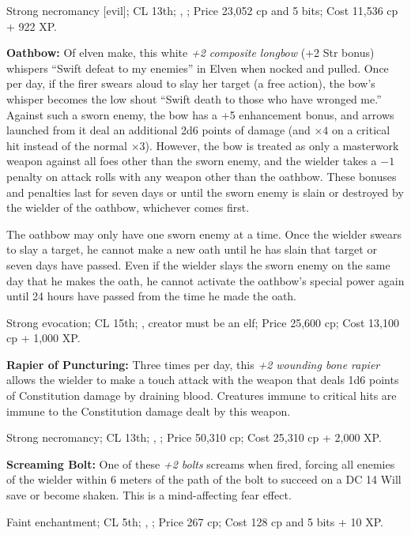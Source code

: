Strong necromancy [evil]; CL 13th; , ; Price 23,052 cp and 5 bits; Cost 11,536 cp + 922 XP.


\textbf{Oathbow:} Of elven make, this white \emph{+2 composite longbow} (+2 Str bonus) whispers ``Swift defeat to my enemies'' in Elven when nocked and pulled. Once per day, if the firer swears aloud to slay her target (a free action), the bow's whisper becomes the low shout ``Swift death to those who have wronged me.'' Against such a sworn enemy, the bow has a +5 enhancement bonus, and arrows launched from it deal an additional 2d6 points of damage (and $\times4$ on a critical hit instead of the normal $\times3$). However, the bow is treated as only a masterwork weapon against all foes other than the sworn enemy, and the wielder takes a $-1$ penalty on attack rolls with any weapon other than the oathbow. These bonuses and penalties last for seven days or until the sworn enemy is slain or destroyed by the wielder of the oathbow, whichever comes first.

The oathbow may only have one sworn enemy at a time. Once the wielder swears to slay a target, he cannot make a new oath until he has slain that target or seven days have passed. Even if the wielder slays the sworn enemy on the same day that he makes the oath, he cannot activate the oathbow's special power again until 24 hours have passed from the time he made the oath.

Strong evocation; CL 15th; , creator must be an elf; Price 25,600 cp; Cost 13,100 cp + 1,000 XP.


\textbf{Rapier of Puncturing:} Three times per day, this \emph{+2 wounding bone rapier} allows the wielder to make a touch attack with the weapon that deals 1d6 points of Constitution damage by draining blood. Creatures immune to critical hits are immune to the Constitution damage dealt by this weapon.

Strong necromancy; CL 13th; , ; Price 50,310 cp; Cost 25,310 cp + 2,000 XP.


\textbf{Screaming Bolt:} One of these \emph{+2 bolts} screams when fired, forcing all enemies of the wielder within 6 meters of the path of the bolt to succeed on a DC 14 Will save or become shaken. This is a mind-affecting fear effect.

Faint enchantment; CL 5th; , ; Price 267 cp; Cost 128 cp and 5 bits + 10 XP.


